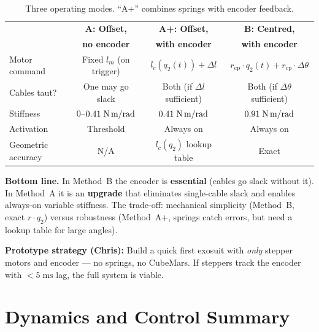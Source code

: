 \documentclass[11pt, a4paper]{article}
\begin{document}
\begin{table}[h]
\centering
\small
\begin{tabular}{@{}lccc@{}}
\toprule
& \textbf{A: Offset,}
& \textbf{A+: Offset,}
& \textbf{B: Centred,} \\
& \textbf{no encoder}
& \textbf{with encoder}
& \textbf{with encoder} \\
\midrule
Motor command
    & Fixed $l_m$ (on trigger)
    & $l_c(q_2(t)) + \Delta l$
    & $r_{\text{cp}} \cdot q_2(t) + r_{\text{cp}} \cdot \Delta\theta$ \\[3pt]
Cables taut?
    & One may go slack
    & Both (if $\Delta l$ sufficient)
    & Both (if $\Delta\theta$ sufficient) \\[3pt]
Stiffness
    & $0$--$0.41\;\text{N\,m/rad}$
    & $0.41\;\text{N\,m/rad}$
    & $0.91\;\text{N\,m/rad}$ \\[3pt]
Activation
    & Threshold
    & Always on
    & Always on \\[3pt]
Geometric accuracy
    & N/A
    & $l_c(q_2)$ lookup table
    & Exact \\
\bottomrule
\end{tabular}
\caption{Three operating modes.  ``A+'' combines springs with encoder feedback.}
\label{tab:three-modes}
\end{table}

\begin{mdframed}
\textbf{Bottom line.}\;
In Method~B the encoder is \textbf{essential} (cables go slack without it).
In Method~A it is an \textbf{upgrade} that eliminates single-cable slack and
enables always-on variable stiffness.  The trade-off: mechanical simplicity
(Method~B, exact $r \cdot q_2$) versus robustness (Method~A+, springs catch
errors, but need a lookup table for large angles).
\end{mdframed}

\begin{mdframed}
\textbf{Prototype strategy (Chris):}
Build a quick first exosuit with \emph{only} stepper motors and encoder
--- no springs, no CubeMars.  If steppers track the encoder with
$<5\;\text{ms}$ lag, the full system is viable.
\end{mdframed}


\section{Dynamics and Control Summary}
\label{sec:dynamics}
\end{document}

